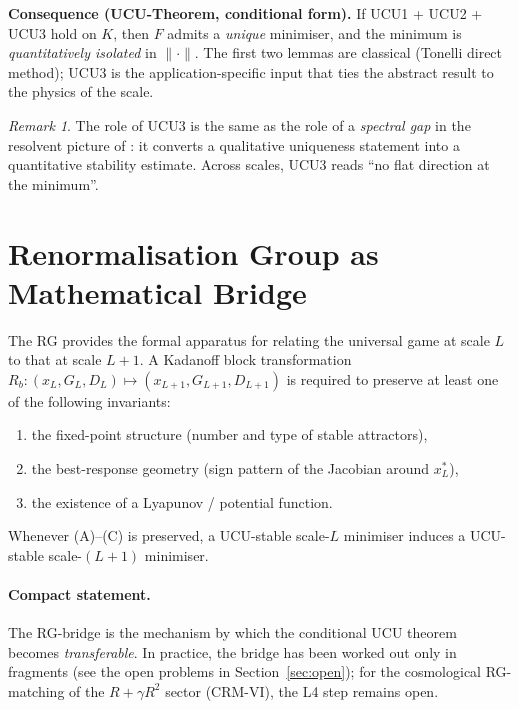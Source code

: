 \documentclass[11pt,a4paper]{article}
\theoremstyle{remark}
\newtheorem*{remark}{Remark}
\begin{document}
\noindent\textbf{Consequence (UCU-Theorem, conditional form).}
If UCU1 + UCU2 + UCU3 hold on $K$, then $F$ admits a \emph{unique}
minimiser, and the minimum is \emph{quantitatively isolated} in
$\|\cdot\|$. The first two lemmas are classical (Tonelli direct
method); UCU3 is the application-specific input that ties the
abstract result to the physics of the scale.

\begin{remark}
The role of UCU3 is the same as the role of a \emph{spectral gap}
in the resolvent picture of \cite{GeigerZookeeper-2026}: it converts a
qualitative uniqueness statement into a quantitative stability
estimate. Across scales, UCU3 reads ``no flat direction at the
minimum''.
\end{remark}

\section{Renormalisation Group as Mathematical Bridge}
\label{sec:rg-bridge}

The RG provides the formal apparatus for relating the universal game
at scale $L$ to that at scale $L+1$. A Kadanoff block transformation
$R_b : (x_L, G_L, D_L) \mapsto (x_{L+1}, G_{L+1}, D_{L+1})$ is required
to preserve at least one of the following invariants:
\begin{enumerate}[label=(\Alph*),leftmargin=2em]
\item the fixed-point structure (number and type of stable attractors),
\item the best-response geometry (sign pattern of the Jacobian
      around $x_L^*$),
\item the existence of a Lyapunov / potential function.
\end{enumerate}
Whenever (A)--(C) is preserved, a UCU-stable scale-$L$ minimiser
induces a UCU-stable scale-$(L{+}1)$ minimiser.

\paragraph{Compact statement.}
The RG-bridge is the mechanism by which the conditional UCU theorem
becomes \emph{transferable}. In practice, the bridge has been worked
out only in fragments (see the open problems in
Section~\ref{sec:open}); for the cosmological RG-matching of the
$R + \gamma R^2$ sector (CRM-VI), the L4 step remains open.
\end{document}
